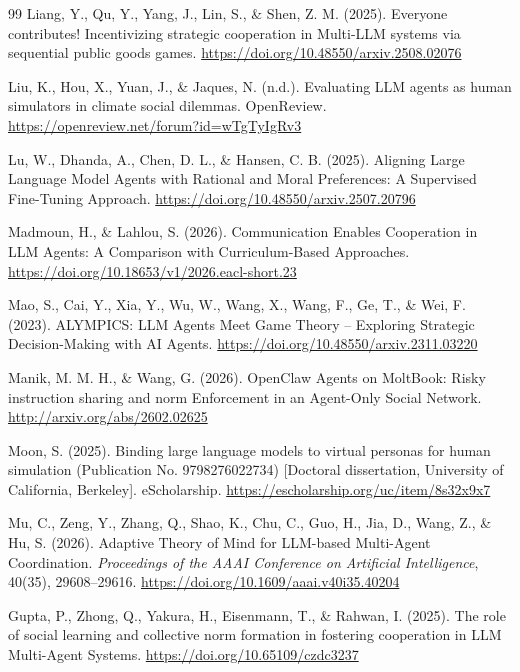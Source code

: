 \documentclass[12pt,letterpaper]{report}
\begin{document}
\begin{thebibliography}{99}
Liang, Y., Qu, Y., Yang, J., Lin, S., \& Shen, Z. M. (2025). Everyone contributes! Incentivizing strategic cooperation in Multi-LLM systems via sequential public goods games. \url{https://doi.org/10.48550/arxiv.2508.02076}

Liu, K., Hou, X., Yuan, J., \& Jaques, N. (n.d.). Evaluating LLM agents as human simulators in climate social dilemmas. OpenReview. \url{https://openreview.net/forum?id=wTgTyIgRv3}

Lu, W., Dhanda, A., Chen, D. L., \& Hansen, C. B. (2025). Aligning Large Language Model Agents with Rational and Moral Preferences: A Supervised Fine-Tuning Approach. \url{https://doi.org/10.48550/arxiv.2507.20796}

Madmoun, H., \& Lahlou, S. (2026). Communication Enables Cooperation in LLM Agents: A Comparison with Curriculum-Based Approaches. \url{https://doi.org/10.18653/v1/2026.eacl-short.23}

Mao, S., Cai, Y., Xia, Y., Wu, W., Wang, X., Wang, F., Ge, T., \& Wei, F. (2023). ALYMPICS: LLM Agents Meet Game Theory -- Exploring Strategic Decision-Making with AI Agents. \url{https://doi.org/10.48550/arxiv.2311.03220}

Manik, M. M. H., \& Wang, G. (2026). OpenClaw Agents on MoltBook: Risky instruction sharing and norm Enforcement in an Agent-Only Social Network. \url{http://arxiv.org/abs/2602.02625}

Moon, S. (2025). Binding large language models to virtual personas for human simulation (Publication No. 9798276022734) [Doctoral dissertation, University of California, Berkeley]. eScholarship. \url{https://escholarship.org/uc/item/8s32x9x7}

Mu, C., Zeng, Y., Zhang, Q., Shao, K., Chu, C., Guo, H., Jia, D., Wang, Z., \& Hu, S. (2026). Adaptive Theory of Mind for LLM-based Multi-Agent Coordination. \textit{Proceedings of the AAAI Conference on Artificial Intelligence}, 40(35), 29608--29616. \url{https://doi.org/10.1609/aaai.v40i35.40204}

Gupta, P., Zhong, Q., Yakura, H., Eisenmann, T., \& Rahwan, I. (2025). The role of social learning and collective norm formation in fostering cooperation in LLM Multi-Agent Systems. \url{https://doi.org/10.65109/czdc3237}


\end{thebibliography}
\end{document}
